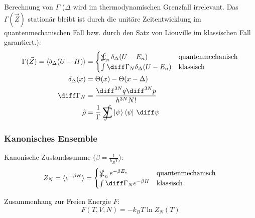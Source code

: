 \documentclass[11pt]{article}
\DeclareMathOperator*{\SumInt}{%
\mathchoice%
  {\ooalign{$\displaystyle\sum$\cr\hidewidth$\displaystyle\int$\hidewidth\cr}}
  {\ooalign{\raisebox{.14\height}{\scalebox{.7}{$\textstyle\sum$}}\cr\hidewidth$\textstyle\int$\hidewidth\cr}}
  {\ooalign{\raisebox{.2\height}{\scalebox{.6}{$\scriptstyle\sum$}}\cr$\scriptstyle\int$\cr}}
  {\ooalign{\raisebox{.2\height}{\scalebox{.6}{$\scriptstyle\sum$}}\cr$\scriptstyle\int$\cr}}
}
\numberwithin{equation}{section}
\begin{document}
				\noindent
				Berechnung von $\Gamma$ ($\Delta$ wird im thermodynamischen Grenzfall irrelevant. Das $\Gamma(\vec{Z})$ stationär bleibt ist durch die unitäre Zeitentwicklung im quantenmechanischen Fall bzw. durch den Satz von Liouville im klassischen Fall garantiert.):
				\begin{equation}
					\begin{aligned}
						\Gamma(\vec{Z}) = \langle \delta_\Delta (U-H) \rangle
							&= \begin{cases}
									\SumInt_n \delta_\Delta(U-E_n) & \text{quantenmechanisch} \\
									\int \diff \Gamma_N \delta_\Delta(U-E_n) & \text{klassisch}
								\end{cases} \\
						\delta_\Delta(x) &= \Theta(x) - \Theta(x-\Delta)\\
						\diff \Gamma_N &= \frac{\diff^{3N}q \diff^{3N}p }{h^{3N} N!} \\
						\hat{\rho} &= \frac{1}{\Gamma} \SumInt \Ket{\psi}\Bra{\psi}\,\diff\psi
					\end{aligned}
				\end{equation}

			\subsubsection{Kanonisches Ensemble}
				\noindent
				Kanonische Zustandssumme ($\beta = \frac{1}{k_B T}$):
				\begin{equation}
					Z_N=\langle e^{-\beta H} \rangle
						= \begin{cases}
								\SumInt_n e^{-\beta E_n} & \text{quantenmechanisch} \\
								\int \diff \Gamma_N e^{-\beta H} & \text{klassisch}
							\end{cases} \\
				\end{equation}

				\noindent
				Zusammenhang zur Freien Energie $F$:
				\begin{equation}
					F(T, V, N) = -k_B T \ln{Z_N(T)}
				\end{equation}

\end{document}
